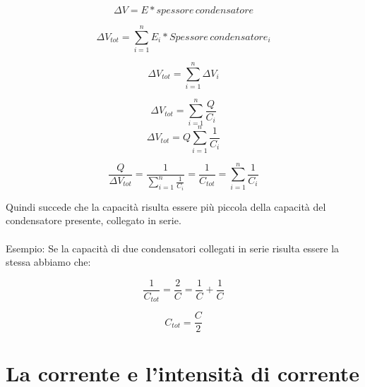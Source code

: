 \begin{equation*}
    \Delta V = E * {spessore\,condensatore}
\end{equation*}

\begin{equation*}
    \Delta V_{tot} = \sum_{i = 1}^n E_i * {Spessore\,condensatore_i}
\end{equation*}

\begin{equation*}
    \Delta V_{tot} = \sum_{i = 1}^n \Delta V_i
\end{equation*}

\begin{equation*}
    \Delta V_{tot} = \sum_{i = 1}^n\frac{Q}{C_i}
\end{equation*}
\begin{equation*}
    \Delta V_{tot} = Q \sum_{i = 1}^n\frac{1}{C_i}
\end{equation*}

\begin{equation}
    \frac{Q}{\Delta V_{tot}}  = \frac{1}{\sum_{i = 1}^n\frac{1}{C_i}} = \frac{1}{C_{tot}} = \sum_{i = 1}^n \frac{1}{C_i}
\end{equation}

Quindi succede che la capacità risulta essere più piccola della capacità del condensatore presente, collegato in serie.
\paragraph{}
Esempio: Se la capacità di due condensatori collegati in serie risulta essere la stessa abbiamo che:

\begin{equation*}
    \frac{1}{C_{tot}} = \frac{2}{C} = \frac{1}{C} + \frac{1}{C}
\end{equation*}

\begin{equation*}
    C_{tot} = \frac{C}{2} 
\end{equation*}

\section{La corrente e l'intensità di corrente}

